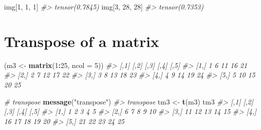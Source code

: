 \documentclass[]{book}
\newenvironment{Shaded}{\begin{snugshade}}{\end{snugshade}}
\newcommand{\CommentTok}[1]{\textcolor[rgb]{0.56,0.35,0.01}{\textit{#1}}}
\newcommand{\DataTypeTok}[1]{\textcolor[rgb]{0.13,0.29,0.53}{#1}}
\newcommand{\DecValTok}[1]{\textcolor[rgb]{0.00,0.00,0.81}{#1}}
\newcommand{\KeywordTok}[1]{\textcolor[rgb]{0.13,0.29,0.53}{\textbf{#1}}}
\newcommand{\NormalTok}[1]{#1}
\newcommand{\OperatorTok}[1]{\textcolor[rgb]{0.81,0.36,0.00}{\textbf{#1}}}
\newcommand{\StringTok}[1]{\textcolor[rgb]{0.31,0.60,0.02}{#1}}
\begin{document}
\begin{Shaded}
\begin{Highlighting}[]
\NormalTok{img[}\DecValTok{1}\NormalTok{, }\DecValTok{1}\NormalTok{, }\DecValTok{1}\NormalTok{]}
\CommentTok{#> tensor(0.7845)}
\NormalTok{img[}\DecValTok{3}\NormalTok{, }\DecValTok{28}\NormalTok{, }\DecValTok{28}\NormalTok{]}
\CommentTok{#> tensor(0.7353)}
\end{Highlighting}
\end{Shaded}

\hypertarget{transpose-of-a-matrix}{%
\section{Transpose of a matrix}\label{transpose-of-a-matrix}}

\begin{Shaded}
\begin{Highlighting}[]
\NormalTok{(m3 <-}\StringTok{ }\KeywordTok{matrix}\NormalTok{(}\DecValTok{1}\OperatorTok{:}\DecValTok{25}\NormalTok{, }\DataTypeTok{ncol =} \DecValTok{5}\NormalTok{))}
\CommentTok{#>      [,1] [,2] [,3] [,4] [,5]}
\CommentTok{#> [1,]    1    6   11   16   21}
\CommentTok{#> [2,]    2    7   12   17   22}
\CommentTok{#> [3,]    3    8   13   18   23}
\CommentTok{#> [4,]    4    9   14   19   24}
\CommentTok{#> [5,]    5   10   15   20   25}

\CommentTok{# transpose}
\KeywordTok{message}\NormalTok{(}\StringTok{"transpose"}\NormalTok{)}
\CommentTok{#> transpose}
\NormalTok{tm3 <-}\StringTok{ }\KeywordTok{t}\NormalTok{(m3)}
\NormalTok{tm3}
\CommentTok{#>      [,1] [,2] [,3] [,4] [,5]}
\CommentTok{#> [1,]    1    2    3    4    5}
\CommentTok{#> [2,]    6    7    8    9   10}
\CommentTok{#> [3,]   11   12   13   14   15}
\CommentTok{#> [4,]   16   17   18   19   20}
\CommentTok{#> [5,]   21   22   23   24   25}
\end{Highlighting}
\end{Shaded}

\begin{Shaded}
\end{Shaded}
\end{document}
